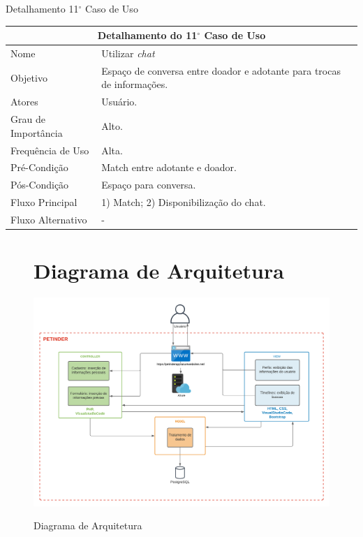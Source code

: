 \begin{apendicesenv}
\begin{quadro}[!htbp]
\caption[Detalhamento 11$^\circ$ Caso de Uso]{Detalhamento 11$^\circ$ Caso de Uso}
\begin{tabular}{|p{4cm}|p{9.95cm}|}
\hline
\multicolumn{2}{|c|}{Detalhamento do 11$^\circ$ Caso de Uso}\\ 
\hline
Nome & Utilizar \textit{chat} \\
\hline
Objetivo & Espaço de conversa entre doador e adotante para trocas de informações. \\
\hline
Atores & Usuário. \\
\hline
Grau de Importância & Alto. \\
\hline
Frequência de Uso & Alta. \\
\hline
Pré-Condição & \gls{Match} entre adotante e doador. \\
\hline
Pós-Condição & Espaço para conversa. \\
\hline
Fluxo Principal & 1) \gls{Match}; 2) Disponibilização do chat. \\
\hline
Fluxo Alternativo & - \\
\hline
\end{tabular}
\end{quadro}

\begin{figure}[!htbp]
\begin{flushleft}
    \section{Diagrama de Arquitetura}
\end{flushleft}
    \centering
    \caption{Diagrama de Arquitetura}
    \includegraphics[width=1\textwidth,pagecommand=\chapter{}]{imagens/DiagramaDeArquitetura_PETINDER.png}
    \label{diagrama-casos}
\end{figure}


\end{apendicesenv}
